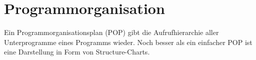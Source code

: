 \section{Programmorganisation}
\label{sec:programmierhandbuch:organisation}

Ein Programmorganisationsplan (POP) gibt die Aufrufhierarchie aller Unterprogramme eines Programms wieder. Noch besser als ein einfacher POP ist eine Darstellung in Form von Structure-Charts.

